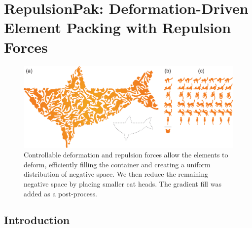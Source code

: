 
\newcommand{\simforce}[1]{\bm{F}_\mathrm{#1}}

\chapter[RepulsionPak: Deformation-Driven Element Packing \newline with Repulsion Forces]
{RepulsionPak: Deformation-Driven Element Packing with Repulsion Forces}
\label{chapter_repulsionpak}
\begin{figure}[h!]
  \centering
  \includegraphics[width=1.0\textwidth]{figures/repulsionpak/cat_whale_04}
  \caption[A packing of a cat]
  {
  \label{cat_packing}
           Controllable deformation and repulsion forces allow the elements to deform,
           efficiently filling the container and creating a uniform distribution of
           negative space. We then reduce the remaining negative space by placing smaller
           cat heads. The gradient fill was added as a post-process.}
\end{figure}



\section{Introduction}
\label{repulsionpak_introduction}


